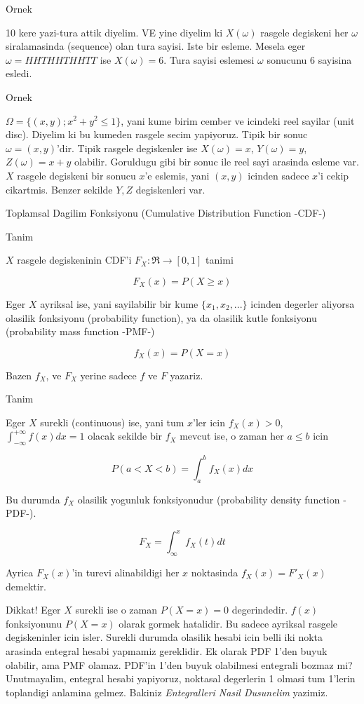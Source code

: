 \documentclass[12pt,fleqn]{article}
\begin{document}
Ornek

10 kere yazi-tura attik diyelim. VE yine diyelim ki $X(\omega)$ rasgele
degiskeni her $\omega$ siralamasinda (sequence) olan tura sayisi. Iste bir
esleme. Mesela eger $\omega = HHTHHTHHTT$ ise $X(\omega) = 6$. Tura sayisi
eslemesi $\omega$ sonucunu 6 sayisina esledi. 

Ornek 

$\Omega = \{ (x,y); x^2+y^2 \le 1 \}$, yani kume birim cember ve icindeki
reel sayilar (unit disc). Diyelim ki bu kumeden rasgele secim
yapiyoruz. Tipik bir sonuc $\omega = (x,y)$'dir. Tipik rasgele degiskenler
ise $X(\omega) = x$, $Y(\omega) = y$, $Z(\omega) = x+y$ olabilir. Goruldugu
gibi bir sonuc ile reel sayi arasinda esleme var. $X$ rasgele degiskeni
bir sonucu $x$'e eslemis, yani $(x,y)$ icinden sadece $x$'i cekip
cikartmis. Benzer sekilde $Y,Z$ degiskenleri var. 

Toplamsal Dagilim Fonksiyonu (Cumulative Distribution Function -CDF-)

Tanim

$X$ rasgele degiskeninin CDF'i $F_X: \Re \to [0,1]$ tanimi

\[ F_X(x) = P(X \ge x) \]

Eger $X$ ayriksal ise, yani sayilabilir bir kume $\{x_1,x_2,...\}$ icinden
degerler aliyorsa olasilik fonksiyonu (probability function), ya da
olasilik kutle fonksiyonu (probability mass function -PMF-) 

\[ f_X(x) = P(X = x) \]

Bazen $f_X$, ve $F_X$ yerine sadece $f$ ve $F$ yazariz. 

Tanim

Eger $X$ surekli (continuous) ise, yani tum $x$'ler icin $f_X(x) > 0$,
$\int_{-\infty}^{+\infty}f(x) dx = 1$ olacak sekilde bir $f_X$ mevcut ise, o zaman her $a \le b$ icin

\[ P(a<X<b) = \int_{a}^{b}f_X(x)dx \]

Bu durumda $f_X$ olasilik yogunluk fonksiyonudur (probability density function
-PDF-). 

\[ F_X = \int_{\infty}^{x}f_X(t)dt \]

Ayrica $F_X(x)$'in turevi alinabildigi her $x$ noktasinda  $f_X(x) = F'_X(x)$
demektir. 

Dikkat! Eger $X$ surekli ise o zaman $P(X = x) = 0$ degerindedir. $f(x)$
fonksiyonunu $P(X=x)$ olarak gormek hatalidir. Bu sadece ayriksal rasgele
degiskeninler icin isler. Surekli durumda olasilik hesabi icin belli iki
nokta arasinda entegral hesabi yapmamiz gereklidir. Ek olarak PDF 1'den
buyuk olabilir, ama PMF olamaz. PDF'in 1'den buyuk olabilmesi entegrali
bozmaz mi? Unutmayalim, entegral hesabi yapiyoruz, noktasal degerlerin 1
olmasi tum 1'lerin toplandigi anlamina gelmez. Bakiniz {\em Entegralleri
  Nasil Dusunelim} yazimiz.
\end{document}
